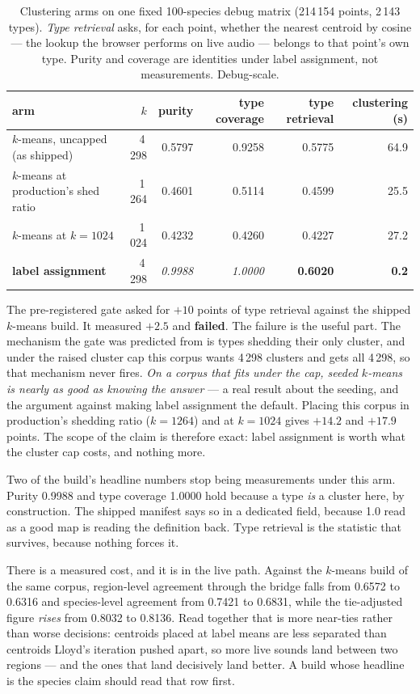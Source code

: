 \documentclass[10pt,twocolumn,a4paper]{article}
\begin{document}
\begin{table}[t]
\centering
\small
\caption{Clustering arms on one fixed 100-species debug matrix (214\,154 points, 2\,143
types). \emph{Type retrieval} asks, for each point, whether the nearest centroid by cosine
--- the lookup the browser performs on live audio --- belongs to that point's own type.
Purity and coverage are identities under label assignment, not measurements. Debug-scale.}
\label{tab:clustering}
\begin{tabular}{L{6.6cm} r r r r r}
\toprule
arm & $k$ & purity & type coverage & type retrieval & clustering (s) \\
\midrule
$k$-means, uncapped (as shipped) & 4\,298 & 0.5797 & 0.9258 & 0.5775 & 64.9 \\
$k$-means at production's shed ratio & 1\,264 & 0.4601 & 0.5114 & 0.4599 & 25.5 \\
$k$-means at $k = 1024$ & 1\,024 & 0.4232 & 0.4260 & 0.4227 & 27.2 \\
\textbf{label assignment} & 4\,298 & \emph{0.9988} & \emph{1.0000} & \textbf{0.6020} & \textbf{0.2} \\
\bottomrule
\end{tabular}
\end{table}

The pre-registered gate asked for $+10$ points of type retrieval against the shipped
$k$-means build. It measured $+2.5$ and \textbf{failed}. The failure is the useful part. The
mechanism the gate was predicted from is types shedding their only cluster, and under the
raised cluster cap this corpus wants 4\,298 clusters and gets all 4\,298, so that mechanism
never fires. \emph{On a corpus that fits under the cap, seeded $k$-means is nearly as good
as knowing the answer} --- a real result about the seeding, and the argument against making
label assignment the default. Placing this corpus in production's shedding ratio
($k = 1264$) and at $k = 1024$ gives $+14.2$ and $+17.9$ points. The scope of the claim is
therefore exact: label assignment is worth what the cluster cap costs, and nothing more.

Two of the build's headline numbers stop being measurements under this arm. Purity 0.9988
and type coverage 1.0000 hold because a type \emph{is} a cluster here, by construction. The
shipped manifest says so in a dedicated field, because 1.0 read as a good map is reading the
definition back. Type retrieval is the statistic that survives, because nothing forces it.

There is a measured cost, and it is in the live path. Against the $k$-means build of the
same corpus, region-level agreement through the bridge falls from 0.6572 to 0.6316 and
species-level agreement from 0.7421 to 0.6831, while the tie-adjusted figure \emph{rises}
from 0.8032 to 0.8136. Read together that is more near-ties rather than worse decisions:
centroids placed at label means are less separated than centroids Lloyd's iteration pushed
apart, so more live sounds land between two regions --- and the ones that land decisively
land better. A build whose headline is the species claim should read that row first.
\end{document}
